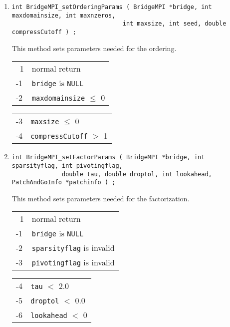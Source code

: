 \begin{enumerate}
\begin{center}
\begin{tabular}{ll}
\end{tabular}
\end{center}
\item
\begin{verbatim}
int BridgeMPI_setOrderingParams ( BridgeMPI *bridge, int maxdomainsize, int maxnzeros, 
                               int maxsize, int seed, double compressCutoff ) ;
\end{verbatim}
This method sets parameters needed for the ordering.
\par {}
\begin{center}
\begin{tabular}{ll}
~1 & normal return \\
-1 & \texttt{bridge} is \texttt{NULL} \\
-2 & \texttt{maxdomainsize} $\le$ 0
\end{tabular}
\begin{tabular}{ll}
-3 & \texttt{maxsize} $\le$ 0 \\
-4 & \texttt{compressCutoff} $>$ 1
\end{tabular}
\end{center}
\item
\begin{verbatim}
int BridgeMPI_setFactorParams ( BridgeMPI *bridge, int sparsityflag, int pivotingflag, 
              double tau, double droptol, int lookahead, PatchAndGoInfo *patchinfo ) ;
\end{verbatim}
This method sets parameters needed for the factorization.
\par {}
\begin{center}
\begin{tabular}{ll}
~1 & normal return \\
-1 & \texttt{bridge} is \texttt{NULL} \\
-2 & \texttt{sparsityflag} is invalid \\
-3 & \texttt{pivotingflag} is invalid 
\end{tabular}
\begin{tabular}{ll}
-4 & \texttt{tau} $<$ 2.0 \\
-5 & \texttt{droptol} $<$ 0.0 \\
-6 & \texttt{lookahead} $<$ 0

\end{tabular}
\end{center}
\end{enumerate}
